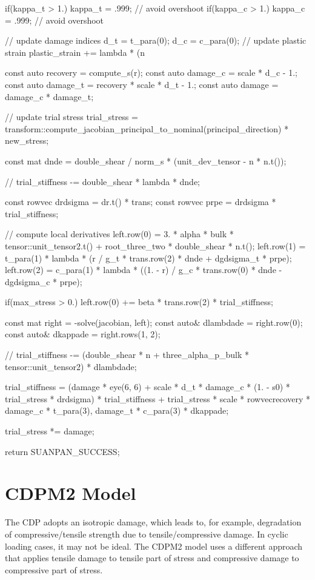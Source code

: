 \begin{cppcode}
{{		if(kappa_t > 1.) kappa_t = .999; // avoid overshoot
		if(kappa_c > 1.) kappa_c = .999; // avoid overshoot
	}

	// update damage indices
	d_t = t_para(0);
	d_c = c_para(0);
	// update plastic strain
	plastic_strain += lambda * (n %

	const auto recovery = compute_s(r);
	const auto damage_c = scale * d_c - 1.;
	const auto damage_t = recovery * scale * d_t - 1.;
	const auto damage = damage_c * damage_t;

	// update trial stress
	trial_stress = transform::compute_jacobian_principal_to_nominal(principal_direction) * new_stress;

	const mat dnde = double_shear / norm_s * (unit_dev_tensor - n * n.t());

	// 
	trial_stiffness -= double_shear * lambda * dnde;

	const rowvec drdsigma = dr.t() * trans;
	const rowvec prpe = drdsigma * trial_stiffness;

	// compute local derivatives
	left.row(0) = 3. * alpha * bulk * tensor::unit_tensor2.t() + root_three_two * double_shear * n.t();
	left.row(1) = t_para(1) * lambda * (r / g_t * trans.row(2) * dnde + dgdsigma_t * prpe);
	left.row(2) = c_para(1) * lambda * ((1. - r) / g_c * trans.row(0) * dnde - dgdsigma_c * prpe);

	if(max_stress > 0.) left.row(0) += beta * trans.row(2) * trial_stiffness;

	const mat right = -solve(jacobian, left);
	const auto& dlambdade = right.row(0);
	const auto& dkappade = right.rows(1, 2);

	// 
	trial_stiffness -= (double_shear * n + three_alpha_p_bulk * tensor::unit_tensor2) * dlambdade;

	trial_stiffness = (damage * eye(6, 6) + scale * d_t * damage_c * (1. - s0) * trial_stress * drdsigma) * trial_stiffness + trial_stress * scale * rowvec{recovery * damage_c * t_para(3), damage_t * c_para(3)} * dkappade;

	trial_stress *= damage;

	return SUANPAN_SUCCESS;
}
\end{cppcode}
\section{CDPM2 Model}
The CDP adopts an isotropic damage, which leads to, for example, degradation of compressive/tensile strength due to tensile/compressive damage. In cyclic loading cases, it may not be ideal. The CDPM2 model uses a different approach that applies tensile damage to tensile part of stress and compressive damage to compressive part of stress.


